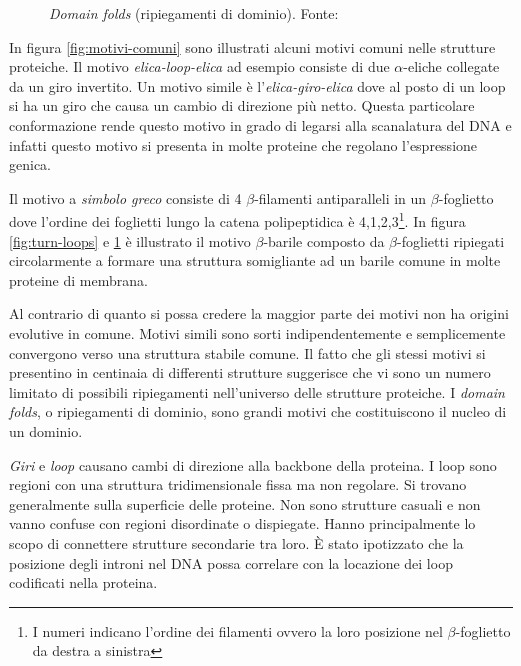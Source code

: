 {\begin{figure}[!htb]
	\caption{\textit{Domain folds} (ripiegamenti di dominio). Fonte: \cite{moran2012principles}}
	\label{fig:domain-folds}
	\endminipage\hfill
	
\end{figure}

\par In figura \ref{fig:motivi-comuni} sono illustrati alcuni motivi comuni nelle strutture proteiche. 
Il motivo \textit{elica-loop-elica} ad esempio consiste di due $\alpha$-eliche collegate da un giro invertito. Un motivo simile è l'\textit{elica-giro-elica} dove al posto di un loop si ha un giro che causa un cambio di direzione più netto. Questa particolare conformazione rende questo motivo in grado di legarsi alla scanalatura del DNA e infatti questo motivo si presenta in molte proteine che regolano l'espressione genica.

\par Il motivo a \textit{simbolo greco} consiste di 4 $\beta$-filamenti antiparalleli in un $\beta$-foglietto dove l'ordine dei foglietti lungo la catena polipeptidica è 4,1,2,3\footnote{I numeri indicano l'ordine dei filamenti ovvero la loro posizione nel $\beta$-foglietto da destra a sinistra}. In figura \ref{fig:turn-loops} e \ref{fig:domain-folds} è illustrato il motivo $\beta$-barile composto da $\beta$-foglietti ripiegati circolarmente a formare una struttura somigliante ad un barile comune in molte proteine di membrana. 

\par Al contrario di quanto si possa credere la maggior parte dei motivi non ha origini evolutive in comune. Motivi simili sono sorti indipendentemente e semplicemente convergono verso una struttura stabile comune. Il fatto che gli stessi motivi si presentino in centinaia di differenti strutture suggerisce che vi sono un numero limitato di possibili ripiegamenti nell'universo delle strutture proteiche\supercite{proteinMotifs}. I \textit{domain folds}, o ripiegamenti di dominio, sono grandi motivi che costituiscono il nucleo di un dominio.

\par \textit{Giri} e \textit{loop} causano cambi di direzione alla backbone della proteina. I loop sono regioni con una struttura tridimensionale fissa ma non regolare. Si trovano generalmente sulla superficie delle proteine. Non sono strutture casuali e non vanno confuse con regioni disordinate o dispiegate. Hanno principalmente lo scopo di connettere strutture secondarie tra loro. È stato ipotizzato che la posizione degli introni nel DNA possa correlare con la locazione dei loop codificati nella proteina\supercite{PSPwiki}.

}
